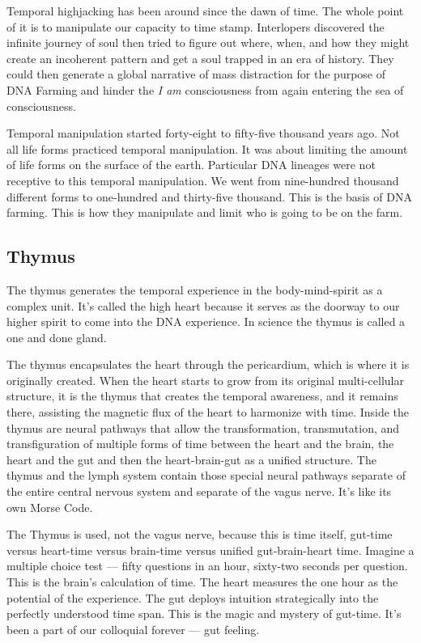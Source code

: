 Temporal highjacking has been around since the dawn of time. The whole
point of it is to manipulate our capacity to time stamp. Interlopers
discovered the infinite journey of soul then tried to figure out where,
when, and how they might create an incoherent pattern and get a soul
trapped in an era of history. They could then generate a global
narrative of mass distraction for the purpose of DNA Farming and hinder
the \emph{I am} consciousness from again entering the sea of
consciousness.

Temporal manipulation started forty-eight to fifty-five thousand years
ago. Not all life forms practiced temporal manipulation. It was about
limiting the amount of life forms on the surface of the earth.
Particular DNA lineages were not receptive to this temporal
manipulation. We went from nine-hundred thousand different forms to
one-hundred and thirty-five thousand. This is the basis of DNA farming.
This is how they manipulate and limit who is going to be on the farm.

\subsection{Thymus}\label{thymus}

The thymus generates the temporal experience in the body-mind-spirit as
a complex unit. It's called the high heart because it serves as the
doorway to our higher spirit to come into the DNA experience. In science
the thymus is called a one and done gland.

The thymus encapsulates the heart through the pericardium, which is
where it is originally created. When the heart starts to grow from its
original multi-cellular structure, it is the thymus that creates the
temporal awareness, and it remains there, assisting the magnetic flux of
the heart to harmonize with time. Inside the thymus are neural pathways
that allow the transformation, transmutation, and transfiguration of
multiple forms of time between the heart and the brain, the heart and
the gut and then the heart-brain-gut as a unified structure. The thymus
and the lymph system contain those special neural pathways separate of
the entire central nervous system and separate of the vagus nerve. It's
like its own Morse Code.

The Thymus is used, not the vagus nerve, because this is time itself,
gut-time versus heart-time versus brain-time versus unified
gut-brain-heart time. Imagine a multiple choice test --- fifty questions
in an hour, sixty-two seconds per question. This is the brain's
calculation of time. The heart measures the one hour as the potential of
the experience. The gut deploys intuition strategically into the
perfectly understood time span. This is the magic and mystery of
gut-time. It's been a part of our colloquial forever --- gut feeling.

